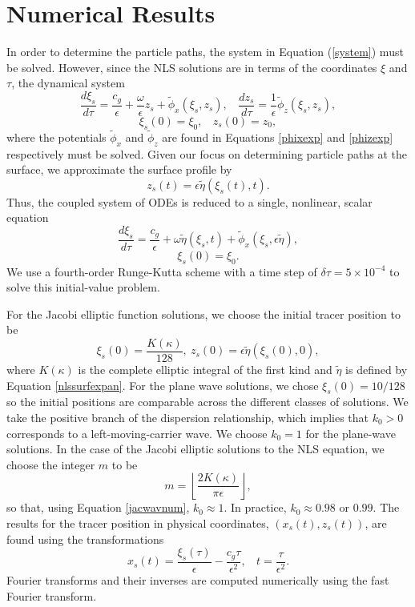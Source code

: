 \documentclass{JFM_Style/jfm}
\begin{document}
\section{Numerical Results}
In order to determine the particle paths, the system in Equation (\ref{system}) must be solved.  However, since the NLS solutions are in terms of the coordinates $\xi$ and $\tau$, the dynamical system
\[
\frac{d \xi_{s}}{d\tau} =  \frac{c_{g}}{\epsilon} + \frac{\omega}{\epsilon}z_{s} + \tilde{\phi}_{x}(\xi_{s},z_{s}), ~~~~ \frac{dz_{s}}{d\tau} = \frac{1}{\epsilon} \tilde{\phi}_{z}(\xi_{s},z_{s}),
\]
\[
\xi_s(0)=\xi_0, ~~~~ z_s(0)=z_0,
\]
where the potentials $\tilde{\phi}_{x}$ and $\tilde{\phi}_{z}$ are found in Equations \eqref{phixexp} and \eqref{phizexp} respectively must be solved.  Given our focus on determining particle paths at the surface, we approximate the surface profile by
\[
z_{s}(t) = \epsilon \tilde{\eta}(\xi_{s}(t),t). 
\]
Thus, the coupled system of ODEs is reduced to a single, nonlinear, scalar equation
\[
\frac{d \xi_{s}}{d\tau} =  \frac{c_{g}}{\epsilon} + \omega\tilde{\eta}(\xi_{s},t) + \tilde{\phi}_{x}(\xi_{s},\epsilon\tilde{\eta}),
\]
\[
\xi_s(0)=\xi_0.
\]
We use a fourth-order Runge-Kutta scheme with a time step of $\delta \tau = 5\times10^{-4}$ to solve this initial-value problem.  

For the Jacobi elliptic function solutions, we choose the initial tracer position to be 
\[
\xi_{s}(0) = \frac{K(\kappa)}{128}, ~ z_{s}(0) = \epsilon \tilde{\eta}(\xi_{s}(0),0),
\]
where $K(\kappa)$ is the complete elliptic integral of the first kind and $\tilde{\eta}$ is defined by Equation \eqref{nlssurfexpan}.  For the plane wave solutions, we chose $\xi_s(0)=10/128$ so the initial positions are comparable across the different classes of solutions.  We take the positive branch of the dispersion relationship, which implies that $k_{0}>0$ corresponds to a left-moving-carrier wave.  We choose $k_{0}=1$ for the plane-wave solutions.  In the case of the Jacobi elliptic solutions to the NLS equation, we choose the integer $m$ to be 
\[
m = \left\lfloor \frac{2K(\kappa)}{\pi \epsilon}\right\rfloor,
\]
so that, using Equation \eqref{jacwavnum}, $k_{0}\approx 1$.  In practice, $k_{0}\approx0.98$ or $0.99$.  The results for the tracer position in physical coordinates, $(x_{s}(t),z_{s}(t))$, are found using the transformations 
\[
x_{s}(t) = \frac{\xi_{s}(\tau)}{\epsilon}-\frac{c_{g}\tau}{\epsilon^{2}}, ~~~~ t = \frac{\tau}{\epsilon^{2}}.
\]
Fourier transforms and their inverses are computed numerically using the fast Fourier transform. 
\end{document}
